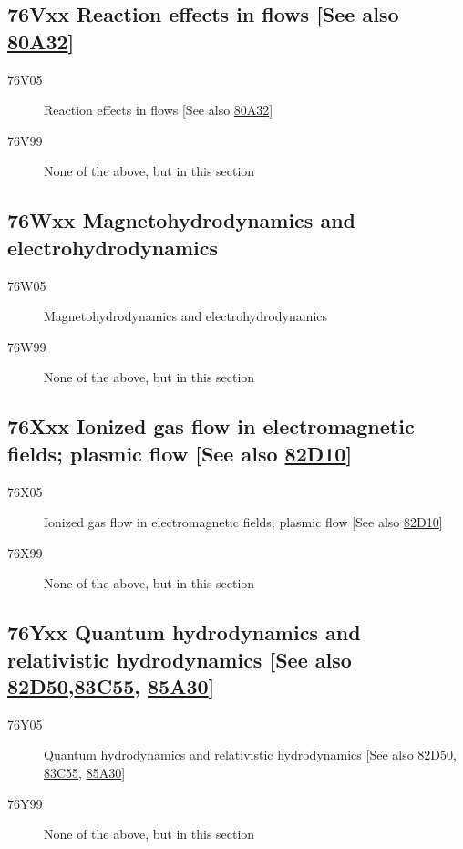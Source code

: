 \subsection*{76Vxx  Reaction effects in flows [See also \hyperref[80A32]{80A32}] }\label{76Vxx}
\begin{description}  
\item [76V05]\label{76V05} Reaction effects in flows [See also \hyperref[80A32]{80A32}]
\item [76V99]\label{76V99} None of the above, but in this section
\end{description}
\subsection*{76Wxx  Magnetohydrodynamics and electrohydrodynamics }\label{76Wxx}
\begin{description}  
\item [76W05]\label{76W05} Magnetohydrodynamics and electrohydrodynamics
\item [76W99]\label{76W99} None of the above, but in this section
\end{description}
\subsection*{76Xxx  Ionized gas flow in electromagnetic fields; plasmic flow [See also \hyperref[82D10]{82D10}] }\label{76Xxx}
\begin{description}  
\item [76X05]\label{76X05} Ionized gas flow in electromagnetic fields; plasmic flow [See also \hyperref[82D10]{82D10}]
\item [76X99]\label{76X99} None of the above, but in this section
\end{description}
\subsection*{76Yxx  Quantum hydrodynamics and relativistic hydrodynamics [See also \hyperref[82D50]{82D50},\newline \hyperref[83C55]{83C55}, \hyperref[85A30]{85A30}] }\label{76Yxx}
\begin{description}  
\item [76Y05]\label{76Y05} Quantum hydrodynamics and relativistic hydrodynamics [See also \hyperref[82D50]{82D50}, \hyperref[83C55]{83C55}, \hyperref[85A30]{85A30}]
\item [76Y99]\label{76Y99} None of the above, but in this section
\end{description}
